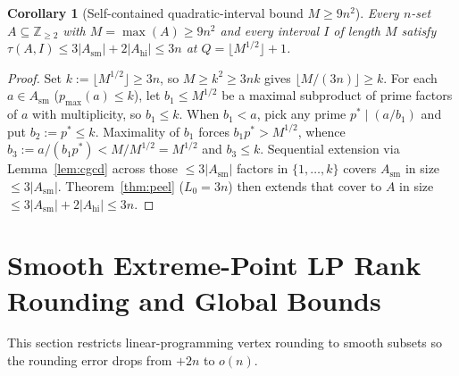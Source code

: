 \documentclass[11pt]{article}
\newtheorem{corollary}[theorem]{Corollary}
\theoremstyle{remark}
\begin{document}
\begin{corollary}[Self-contained quadratic-interval bound $M \ge 9 n^2$]
\label{cor:quad}
Every $n$-set $A \subseteq \mathbb{Z}_{\ge 2}$ with $M = \max(A) \ge 9 n^2$ and every interval $I$ of length $M$ satisfy $\tau(A, I) \le 3 |A_{\mathrm{sm}}| + 2 |A_{\mathrm{hi}}| \le 3 n$ at $Q = \lfloor M^{1/2} \rfloor + 1$.
\end{corollary}
\begin{proof}
Set $k := \lfloor M^{1/2} \rfloor \ge 3 n$, so $M \ge k^2 \ge 3 n k$ gives $\lfloor M / (3 n) \rfloor \ge k$. For each $a \in A_{\mathrm{sm}}$ ($p_{\max}(a) \le k$), let $b_1 \le M^{1/2}$ be a maximal subproduct of prime factors of $a$ with multiplicity, so $b_1 \le k$. When $b_1 < a$, pick any prime $p^* \mid (a / b_1)$ and put $b_2 := p^* \le k$. Maximality of $b_1$ forces $b_1 p^* > M^{1/2}$, whence $b_3 := a / (b_1 p^*) < M / M^{1/2} = M^{1/2}$ and $b_3 \le k$. Sequential extension via Lemma~\ref{lem:cgcd} across those $\le 3 |A_{\mathrm{sm}}|$ factors in $\{1, \dots, k\}$ covers $A_{\mathrm{sm}}$ in size $\le 3 |A_{\mathrm{sm}}|$. Theorem~\ref{thm:peel} ($L_0 = 3 n$) then extends that cover to $A$ in size $\le 3 |A_{\mathrm{sm}}| + 2 |A_{\mathrm{hi}}| \le 3 n$.
\end{proof}

\section{Smooth Extreme-Point LP Rank Rounding and Global Bounds}

This section restricts linear-programming vertex rounding to smooth subsets so the rounding error drops from $+2 n$ to $o(n)$.
\end{document}
